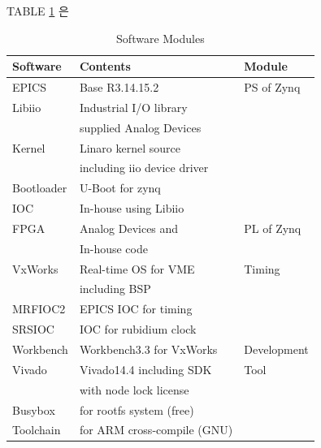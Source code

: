 \documentclass[journal]{IEEEtran}
\begin{document}
\hfill\break
TABLE \ref{sw-conf} 은 
\begin{table}[h!t]
	\centering
	\caption{Software Modules}
	\label{sw-conf}
	
	\begin{tabular}{@{}lll@{}}
		
		\hline
		\textbf{Software} & \textbf{Contents}                 & \textbf{Module}     \\
		\hline
		EPICS        & Base R3.14.15.2                       & PS of Zynq            \\
		Libiio       & Industrial I/O library                &                       \\
		& supplied Analog Devices               &                       \\         
		Kernel       & Linaro kernel source                  &                       \\
		& including iio device driver           &                       \\         
		Bootloader   & U-Boot for zynq                       &                       \\
		IOC          & In-house using Libiio                 &                       \\
		
		\hline
		FPGA         & Analog Devices and                    & PL of Zynq            \\
		& In-house code                         &                       \\
		
		\hline
		VxWorks      & Real-time OS for VME                  & Timing                \\
		& including BSP                         &                       \\         
		MRFIOC2      & EPICS IOC for timing                  &                       \\
		
		\hline
		SRSIOC       & IOC for rubidium clock                &                       \\
		
		\hline
		Workbench    & Workbench3.3 for VxWorks              & Development           \\
		Vivado       & Vivado14.4 including SDK              & Tool                  \\        
		& with node lock license                &                       \\            
		Busybox      & for rootfs system (free)              &                       \\
		Toolchain    & for ARM cross-compile (GNU)           &                       \\        
		\hline
		
	\end{tabular}
\end{table}
\end{document}
